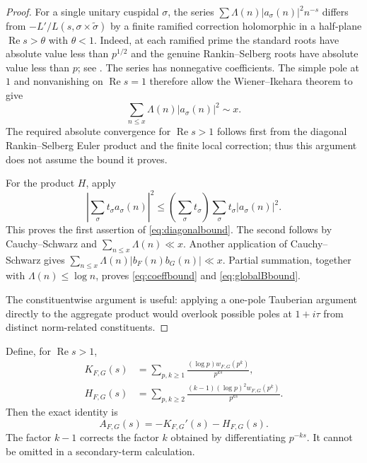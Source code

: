\documentclass[11pt]{article}
\numberwithin{equation}{section}
\theoremstyle{remark}
\newcommand{\Rea}{\operatorname{Re}}
\newcommand{\wt}{\widetilde}
\begin{document}
\begin{proof}
For a single unitary cuspidal $\sigma$, the series
$\sum\Lambda(n)|a_\sigma(n)|^2n^{-s}$ differs from
$-L'/L(s,\sigma\times\wt\sigma)$ by a finite ramified correction
holomorphic in a half-plane $\Rea s>\theta$ with $\theta<1$.
Indeed, at each ramified prime the standard roots have absolute value
less than $p^{1/2}$ and the genuine Rankin--Selberg roots have absolute
value less than $p$; see \cite{BTZ,Ycorr}. The series has nonnegative
coefficients. The simple pole at $1$ and nonvanishing on $\Rea s=1$
therefore allow the Wiener--Ikehara theorem to give
\[
 \sum_{n\leq x}\Lambda(n)|a_\sigma(n)|^2\sim x.
\]
The required absolute convergence for $\Rea s>1$ follows first from
the diagonal Rankin--Selberg Euler product and the finite local
correction; thus this argument does not assume the bound it proves.

For the product $H$, apply
\[
 \left|\sum_\sigma t_\sigma a_\sigma(n)\right|^2
 \leq\left(\sum_\sigma t_\sigma\right)
       \sum_\sigma t_\sigma|a_\sigma(n)|^2.
\]
This proves the first assertion of \eqref{eq:diagonalbound}.
The second follows by Cauchy--Schwarz and
$\sum_{n\leq x}\Lambda(n)\ll x$. Another application of
Cauchy--Schwarz gives
$\sum_{n\leq x}\Lambda(n)|b_F(n)b_G(n)|\ll x$.
Partial summation, together with $\Lambda(n)\leq\log n$, proves
\eqref{eq:coeffbound} and \eqref{eq:globalBbound}.

The constituentwise argument is useful: applying a one-pole Tauberian
argument directly to the aggregate product would overlook possible
poles at $1+i\tau$ from distinct norm-related constituents.
\end{proof}

Define, for $\Rea s>1$,
\begin{align}
 K_{F,G}(s)&=\sum_{p,k\geq1}\frac{(\log p)w_{F,G}(p^k)}{p^{ks}},
       \label{eq:K}\\
 H_{F,G}(s)&=\sum_{p,k\geq2}
       \frac{(k-1)(\log p)^2w_{F,G}(p^k)}{p^{ks}}.
       \label{eq:Hseries}
\end{align}
Then the exact identity is
\begin{equation}\label{eq:Aderivative}
 A_{F,G}(s)=-K_{F,G}'(s)-H_{F,G}(s).
\end{equation}
The factor $k-1$ corrects the factor $k$ obtained by differentiating
$p^{-ks}$. It cannot be omitted in a secondary-term calculation.
\end{document}
